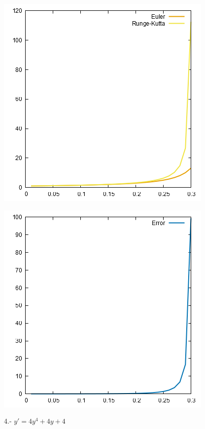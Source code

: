 \documentclass[10pt]{article}
\begin{document}
\begin{multicols}{2}
\begin{center}
				\includegraphics[scale=0.4]{../Graficas/3.png}
			\end{center}
			\begin{center}
				\includegraphics[scale=0.4]{../Graficas/3_1.png}
			\end{center}
			4.- $y'=4y^4+4y+4$
			\begin{center}

\end{center}
\end{multicols}
\end{document}
